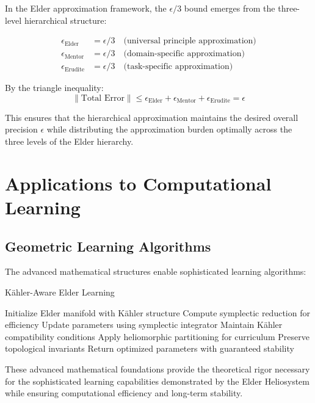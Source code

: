 \begin{theorem}
\label{thm:hierarchical_approximation}
In the Elder approximation framework, the $\epsilon/3$ bound emerges from the three-level hierarchical structure:

\begin{align}
\epsilon_{\text{Elder}} &= \epsilon/3 \quad \text{(universal principle approximation)} \\
\epsilon_{\text{Mentor}} &= \epsilon/3 \quad \text{(domain-specific approximation)} \\
\epsilon_{\text{Erudite}} &= \epsilon/3 \quad \text{(task-specific approximation)}
\end{align}

By the triangle inequality:
\begin{equation}
\|\text{Total Error}\| \leq \epsilon_{\text{Elder}} + \epsilon_{\text{Mentor}} + \epsilon_{\text{Erudite}} = \epsilon
\end{equation}

This ensures that the hierarchical approximation maintains the desired overall precision $\epsilon$ while distributing the approximation burden optimally across the three levels of the Elder hierarchy.
\end{theorem}

\section{Applications to Computational Learning}

\subsection{Geometric Learning Algorithms}

The advanced mathematical structures enable sophisticated learning algorithms:

\begin{algorithm}
\caption{Kähler-Aware Elder Learning}
\begin{algorithmic}[1]
\State Initialize Elder manifold with Kähler structure
\State Compute symplectic reduction for efficiency
    \State Update parameters using symplectic integrator
    \State Maintain Kähler compatibility conditions
    \State Apply heliomorphic partitioning for curriculum
    \State Preserve topological invariants
\EndFor
\State Return optimized parameters with guaranteed stability
\end{algorithmic}
\end{algorithm}

These advanced mathematical foundations provide the theoretical rigor necessary for the sophisticated learning capabilities demonstrated by the Elder Heliosystem while ensuring computational efficiency and long-term stability.
